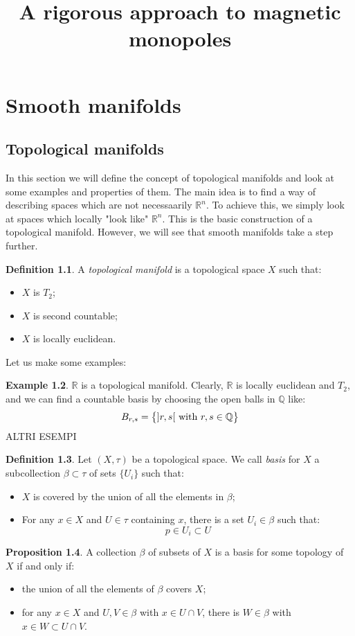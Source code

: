 \documentclass[12pt,a4paper]{report}
\title{A rigorous approach to magnetic monopoles}
\theoremstyle{definition}
\newtheorem{Def}{Definition}[chapter]
\theoremstyle{Theorem}
\newtheorem{Prop}[Def]{Proposition}
\theoremstyle{definition}
\newtheorem{Ex}[Def]{Example}
\theoremstyle{definition}
\begin{document}
	\tableofcontents
	\chapter{Smooth manifolds}
		\section{Topological manifolds}
			In this section we will define the concept of topological manifolds and look at some examples and properties of them. The main idea is to find a way of describing spaces which are not necessaarily $\mathbb{R}^n$. To achieve this, we simply look at spaces which locally "look like" $\mathbb{R}^n$. This is the basic construction of a topological manifold. However, we will see that smooth manifolds take a step further.
			\begin{Def}
				A \textit{topological manifold} is a topological space $X$ such that:
				\begin{itemize}
					\item $X$ is $T_2$;
					\item $X$ is second countable;
					\item $X$ is locally euclidean.
				\end{itemize}
			\end{Def}
			Let us make some examples:
			\begin{Ex}
				$\mathbb{R}$ is a topological manifold. Clearly, $\mathbb{R}$ is locally euclidean and $T_2$, and we can find a countable basis by choosing the open balls in $\mathbb{Q}$ like:
				$$B_{r,s}=\big\{]r,s[\hbox{ with }r,s\in\mathbb{Q}\big\}$$
				ALTRI ESEMPI
			\end{Ex}
			\begin{Def}
				Let $(X,\tau)$ be a topological space. We call \textit{basis} for $X$ a subcollection $\beta\subset\tau$ of sets $\{U_i\}$ such that:
				\begin{itemize}
					\item $X$ is covered by the union of all the elements in $\beta$;
					\item For any $x\in X$ and $U\in \tau$ containing $x$, there is a set $U_i\in \beta$ such that:
					$$p\in U_i\subset U$$ 
				\end{itemize}
			\end{Def}
			\begin{Prop}
				A collection $\beta$ of subsets of  $X$ is a basis for some topology of $X$ if and only if:
				\begin{itemize}
					\item the union of all the elements of $\beta$ covers $X$;
					\item for any $x\in X$ and $U,V\in \beta$ with $x\in U\cap V$, there is $W\in \beta$ with $x\in W\subset U\cap V$.
				\end{itemize}
			\end{Prop}
\end{document}
